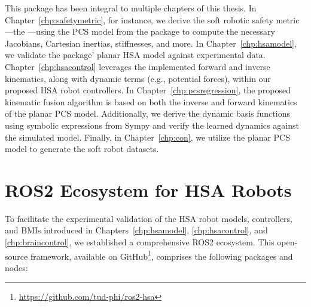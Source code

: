 This package has been integral to multiple chapters of this thesis. In Chapter~\ref{chp:safetymetric}, for instance, we derive the soft robotic safety metric—the —using the \gls{PCS} model from the package to compute the necessary Jacobians, Cartesian inertias, stiffnesses, and more. In Chapter~\ref{chp:hsamodel}, we validate the package' planar \gls{HSA} model against experimental data. Chapter~\ref{chp:hsacontrol} leverages the implemented forward and inverse kinematics, along with dynamic terms (e.g., potential forces), within our proposed \gls{HSA} robot controllers. In Chapter~\ref{chp:pcsregression}, the proposed kinematic fusion algorithm is based on both the inverse and forward kinematics of the planar \gls{PCS} model. Additionally, we derive the dynamic basis functions using symbolic expressions from Sympy and verify the learned dynamics against the simulated model. Finally, in Chapter~\ref{chp:con}, we utilize the planar \gls{PCS} model to generate the soft robot datasets.

\section{ROS2 Ecosystem for HSA Robots}
To facilitate the experimental validation of the \gls{HSA} robot models, controllers, and \glspl{BMI} introduced in Chapters~\ref{chp:hsamodel}, \ref{chp:hsacontrol}, and \ref{chp:braincontrol}, we established a comprehensive ROS2 ecosystem. This open-source framework, available on GitHub\footnote{\url{https://github.com/tud-phi/ros2-hsa}}, comprises the following packages and nodes:

